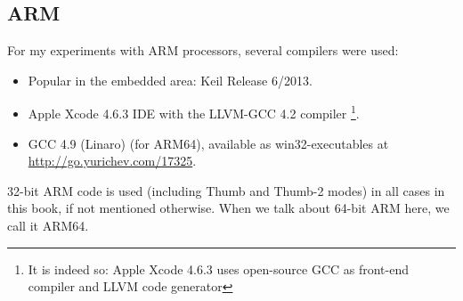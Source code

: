 \subsection{ARM}
\label{sec:hw_ARM}

\myindex{\idevices}
For my experiments with ARM processors, several compilers were used:

\begin{itemize}
\item Popular in the embedded area: Keil Release 6/2013.

\item Apple Xcode 4.6.3 IDE with the LLVM-GCC 4.2 compiler
\footnote{It is indeed so: Apple Xcode 4.6.3 uses open-source GCC as front-end compiler and LLVM 
code generator}.

\item GCC 4.9 (Linaro) (for ARM64), available as win32-executables at \url{http://go.yurichev.com/17325}.

\end{itemize}

32-bit ARM code is used (including Thumb and Thumb-2 modes) in all cases in this book, if not mentioned otherwise.
When we talk about 64-bit ARM here, we call it ARM64.







